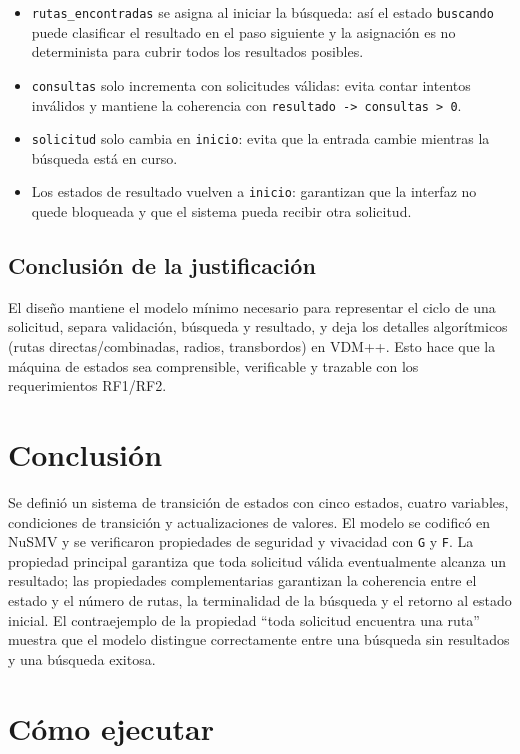 \documentclass[11pt,a4paper]{article}
\begin{document}
\begin{itemize}
  \item \texttt{rutas\_encontradas} se asigna al iniciar la búsqueda: así el estado \texttt{buscando} puede clasificar el resultado en el paso siguiente y la asignación es no determinista para cubrir todos los resultados posibles.
  \item \texttt{consultas} solo incrementa con solicitudes válidas: evita contar intentos inválidos y mantiene la coherencia con \texttt{resultado -> consultas > 0}.
  \item \texttt{solicitud} solo cambia en \texttt{inicio}: evita que la entrada cambie mientras la búsqueda está en curso.
  \item Los estados de resultado vuelven a \texttt{inicio}: garantizan que la interfaz no quede bloqueada y que el sistema pueda recibir otra solicitud.
\end{itemize}

\subsection{Conclusión de la justificación}

El diseño mantiene el modelo mínimo necesario para representar el ciclo de una solicitud, separa validación, búsqueda y resultado, y deja los detalles algorítmicos (rutas directas/combinadas, radios, transbordos) en VDM++. Esto hace que la máquina de estados sea comprensible, verificable y trazable con los requerimientos RF1/RF2.

\section{Conclusión}

Se definió un sistema de transición de estados con cinco estados, cuatro variables, condiciones de transición y actualizaciones de valores. El modelo se codificó en NuSMV y se verificaron propiedades de seguridad y vivacidad con \texttt{G} y \texttt{F}. La propiedad principal garantiza que toda solicitud válida eventualmente alcanza un resultado; las propiedades complementarias garantizan la coherencia entre el estado y el número de rutas, la terminalidad de la búsqueda y el retorno al estado inicial. El contraejemplo de la propiedad ``toda solicitud encuentra una ruta'' muestra que el modelo distingue correctamente entre una búsqueda sin resultados y una búsqueda exitosa.

\section{Cómo ejecutar}
\end{document}

